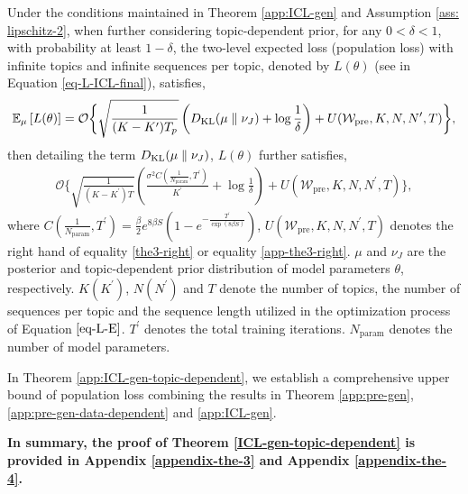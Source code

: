 \begin{theorem} Under the conditions maintained in Theorem \ref{app:ICL-gen} and Assumption \ref{ass: lipschitz-2}, when further considering topic-dependent prior, for any $0<\delta < 1$, with probability at least $1-\delta$, the two-level expected loss (population loss) with infinite topics and infinite sequences per topic, denoted by $L(\theta)$ (see in Equation \ref{eq-L-ICL-final}), satisfies,
	\label{app:ICL-gen-topic-dependent}
    \begin{align*}
        \mathbb{E}_{\mu}\left[L(\theta) \right]
        =\mathcal{O}\biggl\{\sqrt{\frac{1}{(K-K^\prime)T_p}}\left(D_{\mathrm{KL}}(\mu\parallel \nu_J)+\log \frac{1}{\delta}\right)+ U(\mathcal{W}_{\text{pre}},K,N,N^\prime,T)\biggr\},
    \end{align*}
	then detailing the term $D_{\mathrm{KL}}(\mu \parallel \nu_J)$, $L(\theta)$ further satisfies,
	\begin{align}
			\mathcal{O}\biggl\{\sqrt{\frac{1}{(K-K^\prime)T}}\left(\frac{\sigma^2C(\frac{1}{N_{\text{param}}},{T^\prime})}{K^\prime}+\log \frac{1}{\delta}\right)
			+ U(\mathcal{W}_{\text{pre}},K,N,N^\prime,T)\biggr\}, \nonumber
	\end{align}
	where $C(\frac{1}{N_{\text{param}}},T^\prime)=\frac{\beta}{2}e^{8\beta S}\left(1-e^{-\frac{ T^\prime}{\exp(8\beta S)}}\right)$, $U(\mathcal{W}_{\text{pre}},K,N,N^\prime,T)$ denotes the right hand of equality \ref{the3-right} or equality \ref{app-the3-right}. $\mu$ and $\nu_J$ are the posterior and topic-dependent prior distribution of model parameters $\theta$, respectively. $K (K^\prime)$, $N (N^\prime)$ and $T$ denote the number of topics, the number of sequences per topic and the sequence length utilized in the optimization process of Equation $\ref{eq-L-E}$. $T^\prime$ denotes the total training iterations. $N_{\text{param}}$ denotes the number of model parameters.
\end{theorem}
\begin{remark}
	In Theorem \ref{app:ICL-gen-topic-dependent}, we establish a comprehensive upper bound of population loss combining the results in Theorem \ref{app:pre-gen}, \ref{app:pre-gen-data-dependent} and \ref{app:ICL-gen}.
\end{remark}

\textbf{In summary, the proof of Theorem \ref{ICL-gen-topic-dependent} is provided in Appendix \ref{appendix-the-3} and Appendix \ref{appendix-the-4}.}